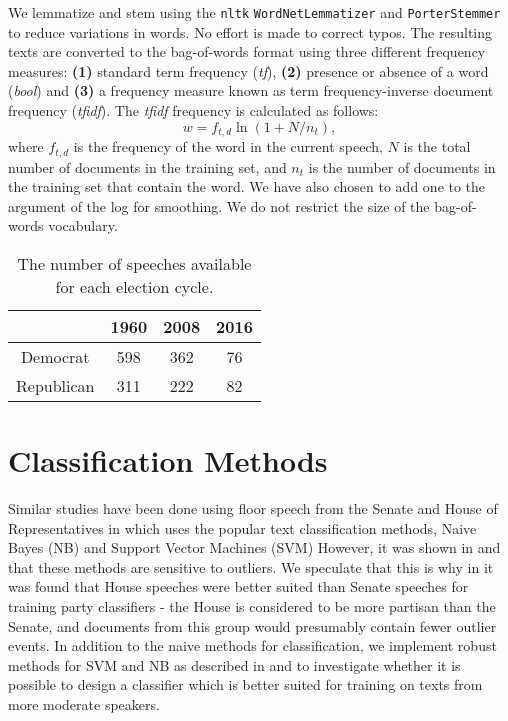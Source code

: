 \documentclass[aps, prl, reprint, showpacs]{revtex4-1}
\begin{document}
We lemmatize and stem using the \texttt{nltk} \texttt{WordNetLemmatizer} and \texttt{PorterStemmer} to reduce variations in words. No effort is made to correct typos. The resulting texts are converted to the bag-of-words format using three different frequency measures: \textbf{(1)} standard term frequency (\textit{tf}), \textbf{(2)} presence or absence of a word (\textit{bool}) and \textbf{(3)} a frequency measure known as term frequency-inverse document frequency (\textit{tfidf}). The \textit{tfidf} frequency is calculated as follows:
\begin{equation}
    w = f_{t,d} \ln (1 + N/n_t),
\end{equation}
where $f_{t,d}$ is the frequency of the word in the current speech, $N$ is the total number of documents in the training set, and $n_t$ is the number of documents in the training set that contain the word. We have also chosen to add one to the argument of the log for smoothing. We do not restrict the size of the bag-of-words vocabulary.

\begin{table}[h] %
  \label{tab:data}
  \begin{ruledtabular}
  \begin{tabular}{cccc}
   & 1960 & 2008 & 2016 \\
 \hline
    Democrat & 598 & 362  & 76  \\
    Republican & 311 & 222  & 82  \\

 \hline
  \end{tabular}
  \end{ruledtabular}
    \caption{The number of speeches available for each election cycle.}
\end{table}

\section{Classification Methods}
Similar studies have been done using floor speech from the Senate and House of Representatives in \cite{yu} which uses the popular text classification methods, Naive Bayes (NB) and Support Vector Machines (SVM) However, it was shown in \cite{kwon} and \cite{thomas} that these methods are sensitive to outliers. We speculate that this is why in \cite{yu} it was found that House speeches were better suited than Senate speeches for training party classifiers - the House is considered to be more partisan than the Senate, and documents from this group would presumably contain fewer outlier events. In addition to the naive methods for classification, we implement robust methods for SVM and NB as described in \cite{chandra} and \cite{xu} to investigate whether it is possible to design a classifier which is better suited for training on texts from more moderate speakers.
\end{document}
